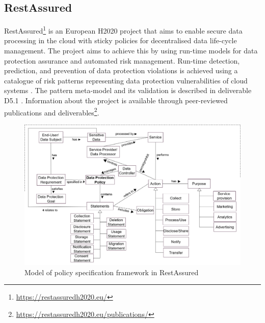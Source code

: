 \subsection*{RestAssured}
RestAssured\footnote{\url{https://restassuredh2020.eu/}} is an European H2020 project that aims to enable secure data processing in the cloud with sticky policies for decentralised data life-cycle management.
The project aims to achieve this by using run-time models for data protection assurance and automated risk management. Run-time detection, prediction, and prevention of data protection violations is achieved using a catalogue of risk patterns representing data protection vulnerabilities of cloud systems \cite{palm_modelling_2018,braubach_using_2018}. The pattern meta-model and its validation is described in deliverable D5.1 \cite{noauthor_d5.1_2018}. Information about the project is available through peer-reviewed publications and deliverables\footnote{\url{https://restassuredh2020.eu/publications/}}.
\begin{figure}[htbp]
    \centering
    \includegraphics[width=\linewidth]{img/RestAssured_model.png}
    \caption{Model of policy specification framework in RestAssured \cite{RestAssured_D6.1}}
    \label{fig:RestAssured-model}
\end{figure}

